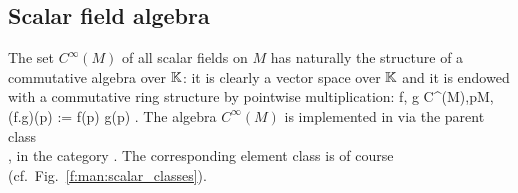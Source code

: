 \subsection{Scalar field algebra} \label{s:man:scal_algebra}

The set $C^\infty(M)$
of all scalar fields on $M$ has naturally the structure of a
commutative algebra over $\mathbb{K}$: it is clearly a vector
space over $\mathbb{K}$ and it is endowed with a commutative ring structure
by pointwise multiplication:
\be
\forall f, g \in C^\infty(M),\quad \forall p\in M,\quad
(f.g)(p) := f(p) g(p) .
\ee
The algebra $C^\infty(M)$ is implemented in \Sage{} via the parent
class\\ , in the category
. The corresponding element class
is of course  (cf.\ Fig.~\ref{f:man:scalar_classes}).

